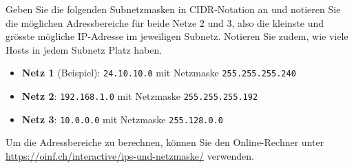 \begin{myexercise}
	Geben Sie die folgenden Subnetzmasken in \gls{CIDR}-Notation an und notieren Sie die möglichen Adressbereiche für beide Netze 2 und 3, also die kleinste und grösste mögliche \gls{IP}-Adresse im jeweiligen Subnetz. Notieren Sie zudem, wie viele Hosts in jedem Subnetz Platz haben.
	\begin{itemize}
		\item \textbf{Netz 1} (Beispiel): \texttt{24.10.10.0} mit Netzmaske \texttt{255.255.255.240}
		\item \textbf{Netz 2}: \texttt{192.168.1.0} mit Netzmaske \texttt{255.255.255.192}
		\item \textbf{Netz 3}: \texttt{10.0.0.0} mit Netzmaske \texttt{255.128.0.0}
	\end{itemize}
	Um die Adressbereiche zu berechnen, können Sie den Online-Rechner unter \url{https://oinf.ch/interactive/ips-und-netzmaske/} verwenden.


\end{myexercise}

